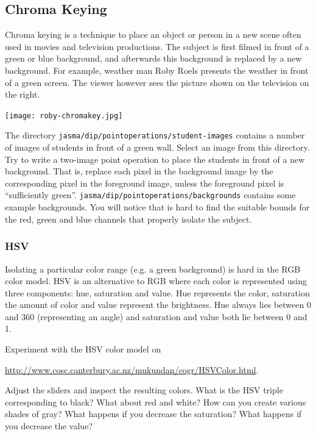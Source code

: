 \documentclass{book}
\begin{document}
\subsection{Chroma Keying}\label{sec:chromakeying}
Chroma keying is a technique to place an object or person in a new scene often used in movies and television productions. The subject is first filmed in front of a green or blue background, and afterwards this background is replaced by a new background. For example, weather man Roby Roels presents the weather in front of a green screen. The viewer however sees the picture shown on the television on the right.
\begin{center}
\texttt{[image: roby-chromakey.jpg]}
\end{center}

\begin{exercise}
The directory \texttt{jasma/dip/pointoperations/student-images} contains a number of images of students in front of a green wall. Select an image from this directory. Try to write a two-image point operation to place the students in front of a new background. That is, replace each pixel in the background image by the corresponding pixel in the foreground image, unless the foreground pixel is ``sufficiently green''.  \texttt{jasma/dip/pointoperations/backgrounds} contains some example backgrounds. You will notice that is hard to find the suitable bounds for the red, green and blue channels that properly isolate the subject.
\end{exercise}

\subsubsection*{HSV}
Isolating a particular color range (e.g. a green background) is hard in the RGB color model. HSV is an alternative to RGB where each color is represented using three components: hue, saturation and value. Hue represents the color, saturation the amount of color and value represent the brightness. Hue always lies between 0 and 360 (representing an angle) and saturation and value both lie between 0 and 1.

\begin{exercise}
Experiment with the HSV color model on

 \href{http://www.cosc.canterbury.ac.nz/mukundan/cogr/HSVColor.html}{http://www.cosc.canterbury.ac.nz/mukundan/cogr/HSVColor.html}. 
 
Adjust the sliders and inspect the resulting colors. What is the HSV triple corresponding to black? What about red and white? How can you create various shades of gray? What happens if you decrease the saturation? What happens if you decrease the value?
\end{exercise}
\end{document}
